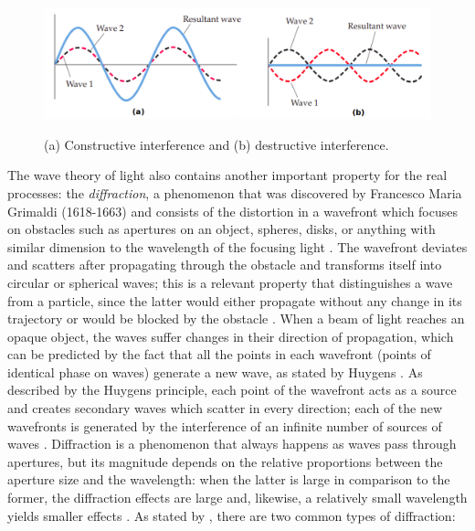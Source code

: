 \begin{figure}[htb]
	\centering
	\caption{\label{fig:interference} 
	    (a) Constructive interference and (b) destructive interference.}
	\begin{center}
	    \includegraphics[width=\textwidth,height=4cm, trim=1 1 1 1,clip]{images/interference.png}
	\end{center}
	\centering
\end{figure}

The wave theory of light also contains another important property for the real processes: the \emph{diffraction}, a phenomenon that was discovered by Francesco Maria Grimaldi (1618-1663) and consists of the distortion in a wavefront which focuses on obstacles such as apertures on an object, spheres, disks, or anything with similar dimension to the wavelength of the focusing light \cite{zilio2009optica}. The wavefront deviates and scatters after propagating through the obstacle and transforms itself into circular or spherical waves; this is a relevant property that distinguishes a wave from a particle, since the latter would either propagate without any change in its trajectory or would be blocked by the obstacle \cite{tipler2007physics}. When a beam of light reaches an opaque object, the waves suffer changes in their direction of propagation, which can be predicted by the fact that all the points in each wavefront (points of identical phase on waves) generate a new wave, as stated by Huygens \cite{fowles1989introduction}. As described by the Huygens principle, each point of the wavefront acts as a source and creates secondary waves which scatter in every direction; each of the new wavefronts is generated by the interference of an infinite number of sources of waves \cite{zilio2009optica}. Diffraction is a phenomenon that always happens as waves pass through apertures, but its magnitude depends on the relative proportions between the aperture size and the wavelength: when the latter is large in comparison to the former, the diffraction effects are large and, likewise, a relatively small wavelength yields smaller effects \cite{tipler2007physics}. As stated by , there are two common types of diffraction:

